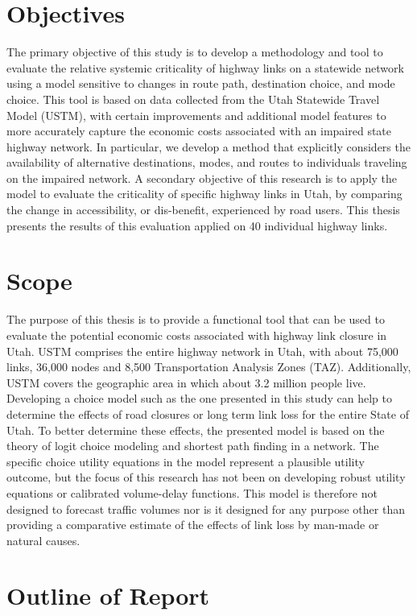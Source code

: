 \section{Objectives}
The primary objective of this study is to develop a methodology and tool to evaluate the
relative systemic criticality of highway links on a statewide network using a model
sensitive to changes in route path, destination choice, and mode choice.
This tool is based on data collected
from the Utah Statewide Travel Model (USTM), with certain improvements and additional model
features to more accurately capture the economic costs associated with an impaired state highway
network. In particular, we develop a method that explicitly considers the availability of
alternative destinations, modes, and routes to individuals traveling on the impaired network. A
secondary objective of this research is to apply the model to evaluate the criticality of
specific
highway links in Utah, by comparing the change in accessibility, or dis-benefit,
experienced by road users.
This thesis presents the results of this evaluation applied
on 40 individual highway links.

\section{Scope}
The purpose of this thesis is to provide a functional tool that can be used to evaluate
the potential economic costs associated with highway link closure in Utah. USTM comprises
the entire highway network in Utah, with about 75,000 links, 36,000 nodes and 8,500 Transportation Analysis Zones (TAZ).
Additionally, USTM covers the geographic area in which about 3.2 million people live.
Developing a choice model such as the one presented in this study can help to determine
the effects of road closures or long term link loss for the entire State of Utah.
To better determine these effects, the presented model is based on the theory of logit choice modeling and
shortest path finding in a network. The specific choice utility equations in the model represent
a plausible utility outcome, but the focus of this research has not been on developing robust
utility equations or calibrated volume-delay functions. This model is therefore not designed to
forecast traffic volumes nor is it designed for any purpose other than providing a comparative estimate
of the effects of link loss by man-made or natural causes.

\newpage
\section{Outline of Report}

